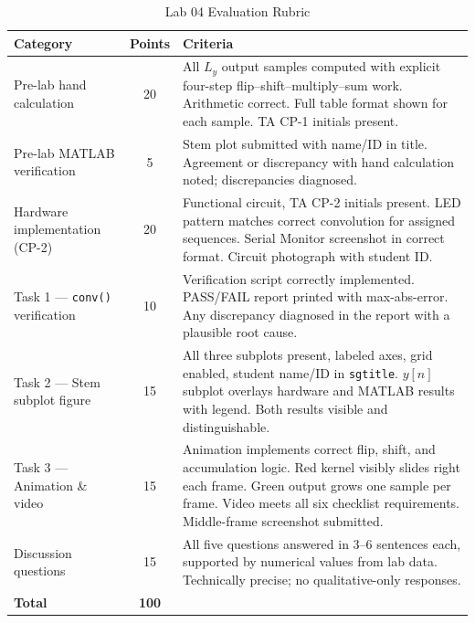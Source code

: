\documentclass[11pt,letterpaper]{article}
\begin{document}
\begin{table}[H]
    \centering
    \caption{Lab 04 Evaluation Rubric}
    \begin{tabularx}{\linewidth}{l c >{\raggedright\arraybackslash}X}
    \toprule
    \textbf{Category} & \textbf{Points} & \textbf{Criteria}\\
    \midrule
    Pre-lab hand calculation
        & 20
        & All $L_y$ output samples computed with explicit four-step flip--shift--multiply--sum work. Arithmetic correct. Full table format shown for each sample. TA CP-1 initials present.\\[0.2cm]
    Pre-lab MATLAB verification
        & 5
        & Stem plot submitted with name/ID in title. Agreement or discrepancy with hand calculation noted; discrepancies diagnosed.\\[0.2cm]
    Hardware implementation (CP-2)
        & 20
        & Functional circuit, TA CP-2 initials present. LED pattern matches correct convolution for assigned sequences. Serial Monitor screenshot in correct format. Circuit photograph with student ID.\\[0.2cm]
    Task 1 --- \texttt{conv()} verification
        & 10
        & Verification script correctly implemented. PASS/FAIL report printed with max-abs-error. Any discrepancy diagnosed in the report with a plausible root cause.\\[0.2cm]
    Task 2 --- Stem subplot figure
        & 15
        & All three subplots present, labeled axes, grid enabled, student name/ID in \texttt{sgtitle}. $y[n]$ subplot overlays hardware and MATLAB results with legend. Both results visible and distinguishable.\\[0.2cm]
    Task 3 --- Animation \& video
        & 15
        & Animation implements correct flip, shift, and accumulation logic. Red kernel visibly slides right each frame. Green output grows one sample per frame. Video meets all six checklist requirements. Middle-frame screenshot submitted.\\[0.2cm]
    Discussion questions
        & 15
        & All five questions answered in 3--6 sentences each, supported by numerical values from lab data. Technically precise; no qualitative-only responses.\\
    \midrule
    \textbf{Total} & \textbf{100} & \\
    \bottomrule
    \end{tabularx}
\end{table}

\clearpage
\end{document}
